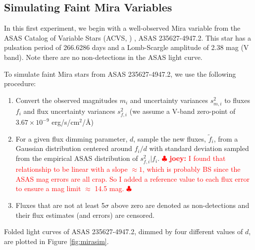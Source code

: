 \documentclass[12pt,preprint]{aastex}
\newcommand{\joey}[1] { \textcolor{red} {
\ensuremath{\clubsuit} {\bf joey:}  {#1}
\ensuremath{\clubsuit} } }%
\begin{document}
\subsection{Simulating Faint Mira Variables}
\label{ss:mirasim}

In this first experiment, we begin with a well-observed Mira variable from the ASAS Catalog of Variable Stars (ACVS, \citealt{acvs}) , ASAS 235627-4947.2.  This star has a pulsation period of 266.6286 days and a Lomb-Scargle amplitude of 2.38 mag (V band).  Note there are no non-detections in the ASAS light curve.

To simulate faint Mira stars from ASAS 235627-4947.2, we use the following procedure:
\begin{enumerate}
\item Convert the observed magnitudes $m_i$ and uncertainty variances $s^2_{m,i}$ to fluxes $f_i$ and flux uncertainty variances $s^2_{f,i}$ (we assume a V-band zero-point of $3.67\times10^{-9}$ erg/s/cm$^2$/\AA)
\item For a given flux dimming parameter, $d$, sample the new fluxes, $\tilde{f}_i$, from a Gaussian distribution centered around $f_i / d$ with standard deviation sampled from the empirical ASAS distribution of $s^2_{f,i} | f_i$. \joey{I found that relationship to be linear with a slope $\approx 1$, which is probably BS since the ASAS mag errors are all crap.  So I added a reference value to each flux error to ensure a mag limit $\approx$ 14.5 mag.}
\item Fluxes that are not at least 5$\sigma$ above zero are denoted as non-detections and their flux estimates (and errors) are censored.
\end{enumerate}
Folded light curves of ASAS 235627-4947.2, dimmed by four different values of $d$, are plotted in Figure \ref{fig:mirasim}.
\end{document}
